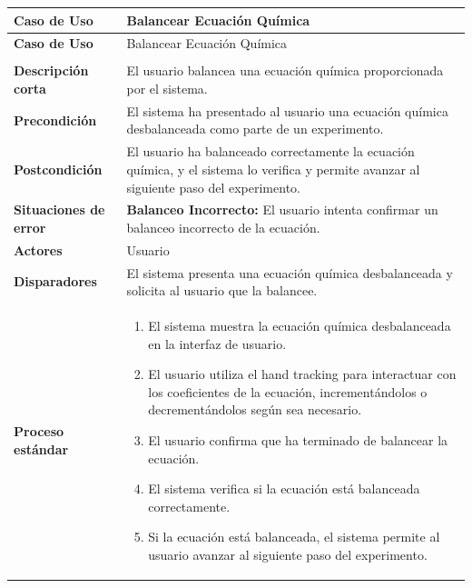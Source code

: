 \begin{longtable}{>{\raggedright\arraybackslash}m{} >{\raggedright\arraybackslash}m{}}
    \toprule\toprule
    \textbf{Caso de Uso} &  Balancear Ecuación Química \\
    \midrule\midrule
    \endfirsthead

    \toprule\toprule
    \textbf{Caso de Uso} &  Balancear Ecuación Química \\
    \midrule\midrule
    \endhead

    \midrule
    \multicolumn{2}{r}{\textit{Continúa en la siguiente página}} \\
    \midrule
    \endfoot

    \endlastfoot

    \textbf{Descripción corta} & El usuario balancea una ecuación química proporcionada por el sistema. \\
    \midrule
    \textbf{Precondición} & El sistema ha presentado al usuario una ecuación química desbalanceada como parte de un experimento. \\
    \midrule
    \textbf{Postcondición} & El usuario ha balanceado correctamente la ecuación química, y el sistema lo verifica y permite avanzar al siguiente paso del experimento.  \\
    \midrule
    \textbf{Situaciones de error} & \textbf{Balanceo Incorrecto:} El usuario intenta confirmar un balanceo incorrecto de la ecuación.   \\
    \midrule
    \textbf{Actores} & Usuario \\
    \midrule
    \textbf{Disparadores} & El sistema presenta una ecuación química desbalanceada y solicita al usuario que la balancee.\\
    \midrule
    \textbf{Proceso estándar} &
    \begin{enumerate}
        \item El sistema muestra la ecuación química desbalanceada en la interfaz de usuario. 
        \item El usuario utiliza el hand tracking para interactuar con los coeficientes de la ecuación, incrementándolos o decrementándolos según sea necesario. 
        \item El usuario confirma que ha terminado de balancear la ecuación. 
        \item El sistema verifica si la ecuación está balanceada correctamente. 
        \item Si la ecuación está balanceada, el sistema permite al usuario avanzar al siguiente paso del experimento.  

\end{enumerate}
\end{longtable}

